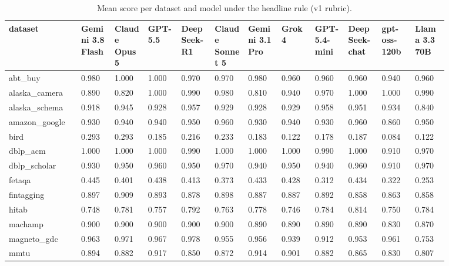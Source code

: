 \begin{landscape}
\tiny
\setlength{\tabcolsep}{3pt}
\begin{longtable}{p{0.134\linewidth}p{0.067\linewidth}p{0.067\linewidth}p{0.067\linewidth}p{0.067\linewidth}p{0.067\linewidth}p{0.067\linewidth}p{0.067\linewidth}p{0.067\linewidth}p{0.067\linewidth}p{0.067\linewidth}p{0.067\linewidth}}
\caption{Mean score per dataset and model under the headline rule (v1 rubric).}\label{tab:per_dataset_mean_v1_rubric}\\
\toprule
dataset & Gemini 3.8 Flash & Claude Opus 5 & GPT-5.5 & DeepSeek-R1 & Claude Sonnet 5 & Gemini 3.1 Pro & Grok 4 & GPT-5.4-mini & DeepSeek-chat & gpt-oss-120b & Llama 3.3 70B \\
\midrule
abt\_\allowbreak{}buy & 0.980 & 1.000 & 1.000 & 0.970 & 0.970 & 0.980 & 0.960 & 0.960 & 0.960 & 0.940 & 0.960 \\
alaska\_\allowbreak{}camera & 0.890 & 0.820 & 1.000 & 0.990 & 0.980 & 0.810 & 0.940 & 0.970 & 1.000 & 1.000 & 0.990 \\
alaska\_\allowbreak{}schema & 0.918 & 0.945 & 0.928 & 0.957 & 0.929 & 0.928 & 0.929 & 0.958 & 0.951 & 0.934 & 0.840 \\
amazon\_\allowbreak{}google & 0.930 & 0.940 & 0.940 & 0.950 & 0.960 & 0.930 & 0.940 & 0.930 & 0.960 & 0.860 & 0.950 \\
bird & 0.293 & 0.293 & 0.185 & 0.216 & 0.233 & 0.183 & 0.122 & 0.178 & 0.187 & 0.084 & 0.122 \\
dblp\_\allowbreak{}acm & 1.000 & 1.000 & 1.000 & 0.990 & 1.000 & 1.000 & 1.000 & 0.990 & 1.000 & 0.910 & 0.970 \\
dblp\_\allowbreak{}scholar & 0.930 & 0.950 & 0.960 & 0.950 & 0.970 & 0.940 & 0.950 & 0.940 & 0.960 & 0.910 & 0.970 \\
fetaqa & 0.445 & 0.401 & 0.438 & 0.413 & 0.373 & 0.433 & 0.428 & 0.312 & 0.434 & 0.322 & 0.253 \\
fintagging & 0.897 & 0.909 & 0.893 & 0.878 & 0.898 & 0.887 & 0.887 & 0.892 & 0.858 & 0.863 & 0.858 \\
hitab & 0.748 & 0.781 & 0.757 & 0.792 & 0.763 & 0.778 & 0.746 & 0.784 & 0.814 & 0.750 & 0.784 \\
machamp & 0.900 & 0.900 & 0.900 & 0.900 & 0.900 & 0.890 & 0.890 & 0.890 & 0.890 & 0.830 & 0.870 \\
magneto\_\allowbreak{}gdc & 0.963 & 0.971 & 0.967 & 0.978 & 0.955 & 0.956 & 0.939 & 0.912 & 0.953 & 0.961 & 0.753 \\
mmtu & 0.894 & 0.882 & 0.917 & 0.850 & 0.872 & 0.914 & 0.901 & 0.882 & 0.865 & 0.830 & 0.807 \\

\end{longtable}
\end{landscape}
